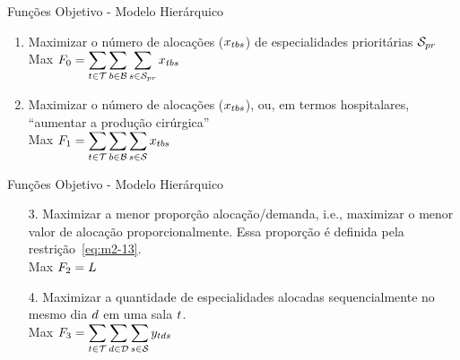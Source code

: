 \documentclass[10pt]{beamer}
\begin{document}
\begin{frame}{Funções Objetivo - Modelo Hierárquico}
    \begin{enumerate}
        \setlength\itemsep{2em}
        \item Maximizar o número de alocações ($x_{tbs}$) de especialidades prioritárias $\mathcal{S}_{pr}$\\
        \vspace{0.5em}
        Max $\displaystyle F_0 = \sum_{t \in \mathcal{T}} \sum_{b \in \mathcal{B}} \sum_{s \in \mathcal{S}_{pr}} x_{tbs}$ 

        \item Maximizar o número de alocações ($x_{tbs}$), ou, em termos hospitalares, ``aumentar a produção cirúrgica''\\
        \vspace{0.5em}
        Max $\displaystyle F_1 = \sum_{t \in \mathcal{T}} \sum_{b \in \mathcal{B}} \sum_{s \in \mathcal{S}} x_{tbs}$ 
    \end{enumerate}
\end{frame}

\begin{frame}{Funções Objetivo - Modelo Hierárquico}
    \begin{enumerate}
        \setlength\itemsep{2em}
        \item[3.] Maximizar a menor proporção alocação/demanda, i.e., maximizar o menor valor de alocação proporcionalmente. Essa proporção é definida pela restrição~\ref{eq:m2-13}.\\
        \vspace{0.5em}  
        Max $\displaystyle F_2 = L$

        \item[4.] Maximizar a quantidade de especialidades alocadas sequencialmente no mesmo dia $d$ em uma sala $t$.\\
        \vspace{0.5em}
        Max $\displaystyle F_3 = \sum_{t \in \mathcal{T}} \sum_{d \in \mathcal{D}} \sum_{s \in \mathcal{S}} y_{tds}$
    \end{enumerate}
\end{frame}
\end{document}
